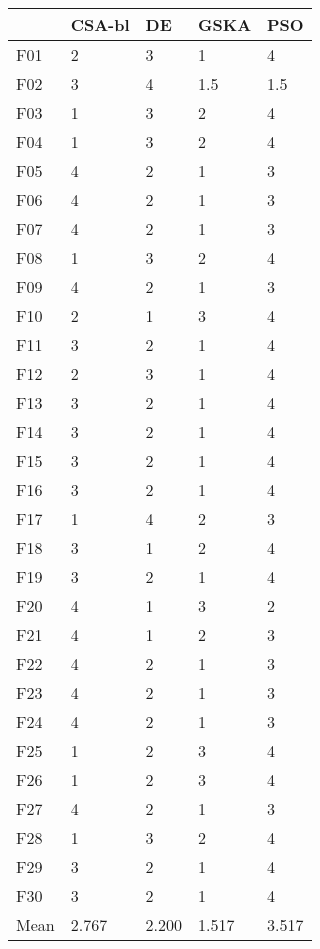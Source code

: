 \begin{tabular}{lllll}
\toprule
{} & CSA-bl &     DE &   GSKA &    PSO \\
\midrule
F01  &      2 &      3 &      1 &      4 \\
F02  &      3 &      4 &    1.5 &    1.5 \\
F03  &      1 &      3 &      2 &      4 \\
F04  &      1 &      3 &      2 &      4 \\
F05  &      4 &      2 &      1 &      3 \\
F06  &      4 &      2 &      1 &      3 \\
F07  &      4 &      2 &      1 &      3 \\
F08  &      1 &      3 &      2 &      4 \\
F09  &      4 &      2 &      1 &      3 \\
F10  &      2 &      1 &      3 &      4 \\
F11  &      3 &      2 &      1 &      4 \\
F12  &      2 &      3 &      1 &      4 \\
F13  &      3 &      2 &      1 &      4 \\
F14  &      3 &      2 &      1 &      4 \\
F15  &      3 &      2 &      1 &      4 \\
F16  &      3 &      2 &      1 &      4 \\
F17  &      1 &      4 &      2 &      3 \\
F18  &      3 &      1 &      2 &      4 \\
F19  &      3 &      2 &      1 &      4 \\
F20  &      4 &      1 &      3 &      2 \\
F21  &      4 &      1 &      2 &      3 \\
F22  &      4 &      2 &      1 &      3 \\
F23  &      4 &      2 &      1 &      3 \\
F24  &      4 &      2 &      1 &      3 \\
F25  &      1 &      2 &      3 &      4 \\
F26  &      1 &      2 &      3 &      4 \\
F27  &      4 &      2 &      1 &      3 \\
F28  &      1 &      3 &      2 &      4 \\
F29  &      3 &      2 &      1 &      4 \\
F30  &      3 &      2 &      1 &      4 \\
Mean &  2.767 &  2.200 &  1.517 &  3.517 \\
\bottomrule
\end{tabular}
